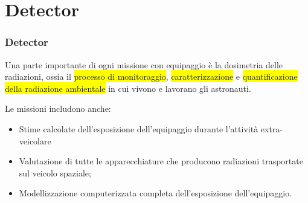 \documentclass[9pt]{beamer}
\begin{document}
\section{Detector}
\begin{frame} [fragile]
	\frametitle{Detector}
Una parte importante di ogni missione con equipaggio \`e la dosimetria delle radiazioni, ossia il \colorbox{yellow}{processo di monitoraggio}, \colorbox{yellow}{caratterizzazione} e \colorbox{yellow}{quantificazione della radiazione ambientale} in cui vivono e lavorano gli astronauti.
\newline 
   
Le missioni includono anche:
\begin{block}{}
\begin{itemize}
\item Stime calcolate dell'esposizione dell'equipaggio durante l'attivit\`a extra-veicolare
\item Valutazione di tutte le apparecchiature che producono radiazioni trasportate sul veicolo spaziale; 
\item Modellizzazione computerizzata completa dell'esposizione dell'equipaggio.
\end{itemize} 
\end{block}
\end{frame}


\end{document}
